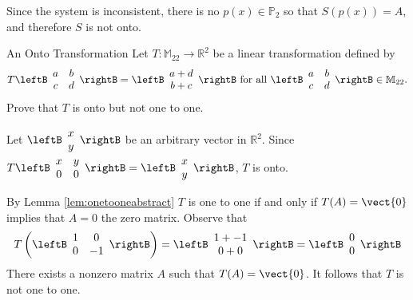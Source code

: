 \begin{solution}
Since the system is inconsistent, there is no $p(x)\in \mathbb{P}_2$ so
that $S(p(x))=A$, and therefore $S$ is not onto.
\end{solution}

\begin{example}{An Onto Transformation}\label{exa:onto}
Let $T:\mathbb{M}_{22}\to\mathbb{R}^2$ be a linear transformation defined by
\[ T\leftB\begin{array}{cc}
a & b \\ c & d \end{array}\rightB
=
\leftB\begin{array}{c}
a+d \\ b+c \end{array}\rightB
\mbox{ for all }
\leftB\begin{array}{cc}
a & b \\ c & d \end{array}\rightB \in\mathbb{M}_{22}.\]
Prove that $T$ is onto but not one to one. 
\end{example}

\begin{solution}
Let $\leftB\begin{array}{c} x \\ y \end{array}\rightB$ be an arbitrary vector in $\mathbb{R}^2$. 
Since 
$T\leftB\begin{array}{cc} x & y \\ 0 & 0 \end{array}\rightB
=\leftB\begin{array}{c} x \\ y \end{array}\rightB$,
$T$  is onto.

By Lemma \ref{lem:onetooneabstract} $T$ is one to one if and only if $T(A) = \vect{0} $ implies that $A = 0$ the zero matrix.
Observe that
\[
T \left( \leftB\begin{array}{cc} 1 & 0 \\ 0 & -1 \end{array}\rightB \right)
=
\leftB \begin{array}{c}
1 + -1 \\
0 + 0 
\end{array}
\rightB
=
\leftB \begin{array}{c}
0 \\
0 
\end{array}
\rightB
\]
There exists a nonzero matrix $A$ such that $T(A) = \vect{0}$. It follows that $T$ is not one to one.
\end{solution}

